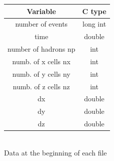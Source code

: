 \documentclass[12pt, a4paper]{article}
\begin{document}
\begin{minipage}{0.6\textwidth}
	\centering
	\begin{tabular}{|c | c |} 
		\hline
		\cellcolor{Yellow}Variable & \cellcolor{Yellow} C type \\
		\hline
		\cellcolor{SpringGreen}number of events&\cellcolor{SpringGreen}long int\\
		\hline
		\cellcolor{LimeGreen}time&\cellcolor{LimeGreen}double\\
		\hline
		\cellcolor{YellowGreen}number of hadrons np&\cellcolor{YellowGreen}int\\
		\hline
		\cellcolor{SeaGreen}numb. of x cells nx&\cellcolor{SeaGreen}int\\
		\hline
		\cellcolor{SeaGreen}numb. of y cells ny&\cellcolor{SeaGreen}int\\
		\hline
		\cellcolor{SeaGreen}numb. of z cells nz&\cellcolor{SeaGreen}int\\
		\hline
		\cellcolor{BlueGreen}dx&\cellcolor{BlueGreen}double\\
		\hline
		\cellcolor{BlueGreen}dy&\cellcolor{BlueGreen}double\\
		\hline
		\cellcolor{BlueGreen}dz&\cellcolor{BlueGreen}double\\
		\hline
	\end{tabular}\\
    \vspace{1mm}
    \footnotesize{Data at the beginning of each file}

\end{minipage}
\end{document}
